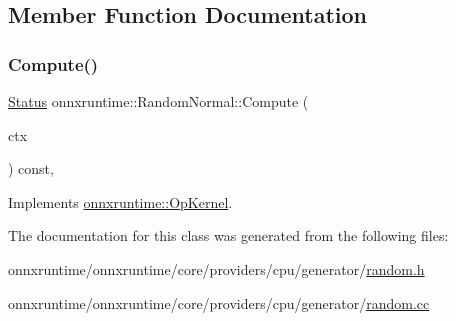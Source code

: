 \subsection{Member Function Documentation}
\mbox{\label{classonnxruntime_1_1RandomNormal_acf11676d882e0d210fdb973d75995159}} 
\subsubsection{\texorpdfstring{Compute()}{Compute()}}
{\footnotesize\ttfamily \mbox{\hyperlink{classonnxruntime_1_1common_1_1Status}{Status}} onnxruntime\+::\+Random\+Normal\+::\+Compute (\begin{DoxyParamCaption}\item[{\mbox{\hyperlink{classonnxruntime_1_1OpKernelContext}{Op\+Kernel\+Context}} $\ast$}]{ctx }\end{DoxyParamCaption}) const\hspace{0.3cm}{\ttfamily [override]}, {\ttfamily [virtual]}}



Implements \mbox{\hyperlink{classonnxruntime_1_1OpKernel_a9eca8656a78b1b3ab9d3351a12798650}{onnxruntime\+::\+Op\+Kernel}}.



The documentation for this class was generated from the following files\+:\begin{DoxyCompactItemize}
\item 
onnxruntime/onnxruntime/core/providers/cpu/generator/\mbox{\hyperlink{random_8h}{random.\+h}}\item 
onnxruntime/onnxruntime/core/providers/cpu/generator/\mbox{\hyperlink{random_8cc}{random.\+cc}}\end{DoxyCompactItemize}
